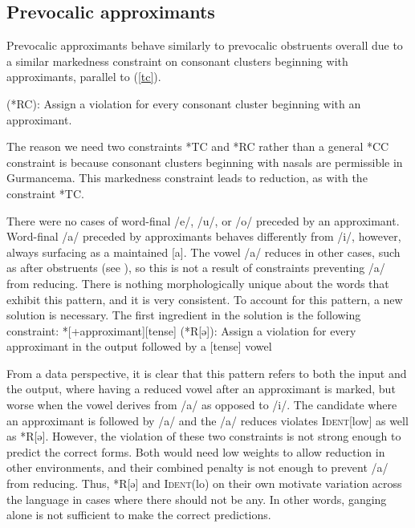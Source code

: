 \documentclass[output=paper,newtxmath,modfonts,nonflat,draftmode]{langsci/langscibook}
\begin{document}
\subsection{Prevocalic approximants}

Prevocalic approximants behave similarly to prevocalic obstruents overall due to a similar markedness constraint on consonant clusters beginning with approximants, parallel to (\ref{tc}). 

\ea	*[+approximant][+consonantal] (*RC): Assign a violation for every consonant 
	cluster beginning with an approximant. 
\z

The reason we need two constraints *TC and *RC rather than a general *CC constraint is because consonant clusters beginning with nasals are permissible in Gurmancema. This markedness constraint leads to reduction, as with the constraint *TC. 


There were no cases of word-final /e/, /u/, or /o/ preceded by an approximant. Word-final /a/ preceded by approximants behaves differently from /i/, 
however, always surfacing as a maintained [a]. The vowel /a/ reduces in other cases, such as after obstruents (see ), so this is not a result of constraints preventing /a/ from reducing. There is nothing morphologically unique about the words that exhibit this pattern, and it is very consistent. To account for this pattern, a new solution is necessary. The first ingredient in the solution is the following constraint: 
\ea
*[+approximant][\textminus tense] (*R[ə]): Assign a violation for every approximant in 	the output followed by a [\textminus tense] vowel
\z

From a data perspective, it is clear that this pattern refers to both the input and the output, where having a reduced vowel after an approximant is marked, but worse when the vowel derives from /a/ as opposed to /i/. The candidate where an approximant is followed by /a/ and the /a/ reduces violates \textsc{Ident}[low] as well as *R[ə]. However, the violation of these two constraints is not strong enough to predict the correct forms. Both would need low weights to allow reduction in other environments, and their combined penalty is not enough to prevent /a/ from reducing. Thus, *R[ə] and \textsc{Ident}(lo) on their own motivate variation across the language in cases where there should not be any. In other words, ganging alone is not sufficient to make the correct predictions. 
	
\end{document}
